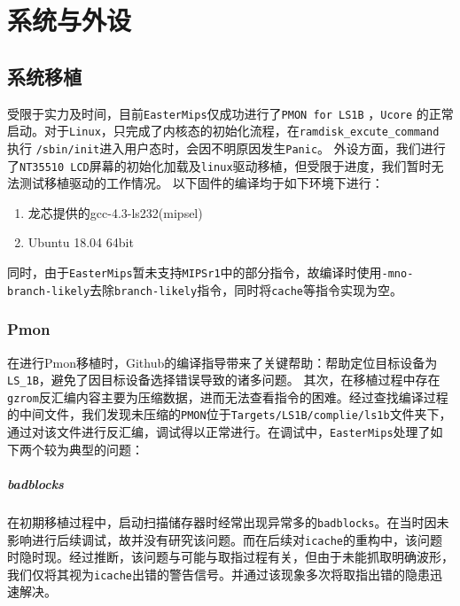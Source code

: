 \chapter{系统与外设}

\hypertarget{ux7cfbux7edfux79fbux690d}{%
\section{系统移植}\label{ux7cfbux7edfux79fbux690d}}

受限于实力及时间，目前\texttt{EasterMips}仅成功进行了\texttt{PMON\ for\ LS1B}
，\texttt{Ucore}
的正常启动。对于\texttt{Linux}，只完成了内核态的初始化流程，在\texttt{ramdisk\_excute\_command}
执行 \texttt{/sbin/init}进入用户态时，会因不明原因发生\texttt{Panic}。
外设方面，我们进行了\texttt{NT35510\ LCD}屏幕的初始化加载及\texttt{linux}驱动移植，但受限于进度，我们暂时无法测试移植驱动的工作情况。
以下固件的编译均于如下环境下进行：

\begin{enumerate}
\item
  龙芯提供的gcc-4.3-ls232(mipsel)
\item
  Ubuntu 18.04 64bit
\end{enumerate}

同时，由于\texttt{EasterMips}暂未支持\texttt{MIPSr1}中的部分指令，故编译时使用\texttt{-mno-branch-likely}去除\texttt{branch-likely}指令，同时将\texttt{cache}等指令实现为空。

\hypertarget{pmon}{%
\subsection{Pmon}\label{pmon}}

在进行Pmon移植时，Github的编译指导带来了关键帮助：帮助定位目标设备为\texttt{LS\_1B}，避免了因目标设备选择错误导致的诸多问题。
其次，在移植过程中存在\texttt{gzrom}反汇编内容主要为压缩数据，进而无法查看指令的困难。经过查找编译过程的中间文件，我们发现未压缩的\texttt{PMON}位于\texttt{Targets/LS1B/complie/ls1b}文件夹下，通过对该文件进行反汇编，调试得以正常进行。在调试中，\texttt{EasterMips}处理了如下两个较为典型的问题：

\hypertarget{badblocksux89e3ux51b3}{%
\paragraph{badblocks}\label{badblocksux89e3ux51b3}}

在初期移植过程中，启动扫描储存器时经常出现异常多的\texttt{badblocks}。在当时因未影响进行后续调试，故并没有研究该问题。而在后续对\texttt{icache}的重构中，该问题时隐时现。经过推断，该问题与可能与取指过程有关，但由于未能抓取明确波形，我们仅将其视为\texttt{icache}出错的警告信号。并通过该现象多次将取指出错的隐患迅速解决。

